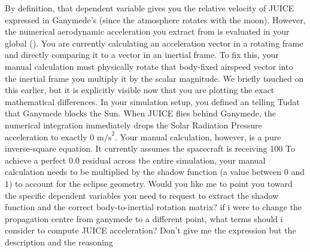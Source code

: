{}By definition, that dependent variable gives you the relative velocity of JUICE expressed in Ganymede's  (since the atmosphere rotates with the moon). However, the numerical aerodynamic acceleration you extract from  is evaluated in your global  ().\markdownRendererInterblockSeparator
{}You are currently calculating an acceleration vector in a rotating frame and directly comparing it to a vector in an inertial frame. To fix this, your manual calculation must physically rotate that body-fixed airspeed vector into the inertial frame  you multiply it by the scalar magnitude.\markdownRendererInterblockSeparator
{}
\markdownRendererSectionEnd \markdownRendererSectionBegin
{}\markdownRendererInterblockSeparator
{}We briefly touched on this earlier, but it is explicitly visible now that you are plotting the exact mathematical differences.\markdownRendererInterblockSeparator
{}In your simulation setup, you defined an  telling Tudat that Ganymede blocks the Sun. When JUICE flies behind Ganymede, the numerical integration immediately drops the Solar Radiation Pressure acceleration to exactly $0 \text{ m/s}^2$.\markdownRendererInterblockSeparator
{}Your manual calculation, however, is a pure inverse-square equation. It currently assumes the spacecraft is receiving 100\markdownRendererInterblockSeparator
{}To achieve a perfect $0.0$ residual across the entire simulation, your manual calculation needs to be multiplied by the shadow function (a value between $0$ and $1$) to account for the eclipse geometry.\markdownRendererInterblockSeparator
{}\markdownRendererThematicBreak{}\markdownRendererInterblockSeparator
{}Would you like me to point you toward the specific dependent variables you need to request to extract the shadow function and the correct body-to-inertial rotation matrix?\markdownRendererInterblockSeparator
{}\markdownRendererThematicBreak{}\markdownRendererInterblockSeparator
{}
\markdownRendererSectionEnd 
\markdownRendererSectionEnd \markdownRendererSectionBegin
{}\markdownRendererInterblockSeparator
{}if i were to change the propagation centre from ganymede to a different point, what terms should i consider to compute JUICE acceleration? Don't give me the expression but the description and the reasoning\markdownRendererInterblockSeparator

